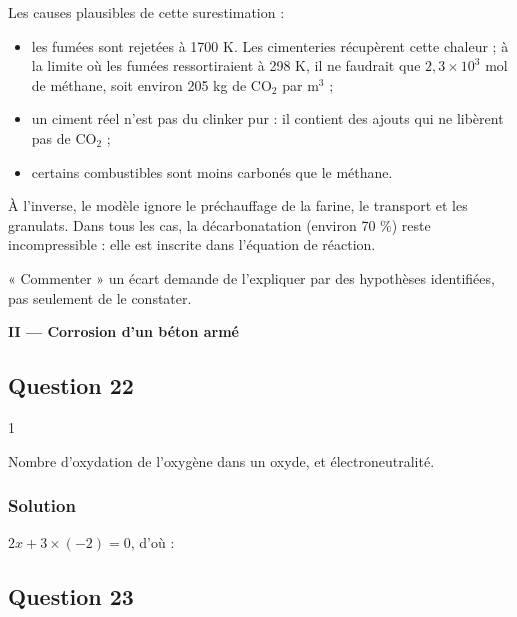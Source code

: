 \documentclass[11pt,a4paper]{article}
\providecommand{\tightlist}{\setlength{\itemsep}{0pt}\setlength{\parskip}{0pt}}
\newcommand{\equationajustee}[1]{%
  \sbox{\boiteequation}{$\displaystyle #1$}%
  \ifdim\wd\boiteequation>\linewidth
    \[\resizebox{\linewidth}{!}{\usebox{\boiteequation}}\]%
  \else
    \[#1\]%
  \fi}
\begin{document}
Les causes plausibles de cette surestimation :

\begin{itemize}
\tightlist
\item
  les fumées sont rejetées à 1700 K. Les cimenteries récupèrent cette chaleur ; à la limite où les fumées ressortiraient à 298 K, il ne faudrait que \(2{,}3\times10^{3}\) mol de méthane, soit environ 205 kg de \(\mathrm{CO_2}\) par \(\mathrm{m^3}\) ;
\item
  un ciment réel n'est pas du clinker pur : il contient des ajouts qui ne libèrent pas de \(\mathrm{CO_2}\) ;
\item
  certains combustibles sont moins carbonés que le méthane.
\end{itemize}

À l'inverse, le modèle ignore le préchauffage de la farine, le transport et les granulats. Dans tous les cas, la décarbonatation (environ 70 \%) reste incompressible : elle est inscrite dans l'équation de réaction.

\begin{jury}

« Commenter » un écart demande de l'expliquer par des hypothèses identifiées, pas seulement de le constater.

\end{jury}

\textbf{II --- Corrosion d'un béton armé}

\hypertarget{question-22}{%
\subsection{Question 22}\label{question-22}}

\begin{indication}{1}

Nombre d'oxydation de l'oxygène dans un oxyde, et électroneutralité.

\end{indication}

\hypertarget{solution-21}{%
\subsubsection{Solution}\label{solution-21}}

\(2x + 3\times(-2) = 0\), d'où :

\equationajustee{\boxed{n.o.(\mathrm{Fe}) = +\mathrm{III}}}

\hypertarget{question-23}{%
\subsection{Question 23}\label{question-23}}
\end{document}
